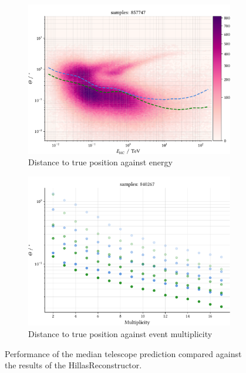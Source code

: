 \begin{figure}
    \centering
    \begin{subfigure}{0.5\textwidth}
        \includegraphics[width=\linewidth]{../analysis/plots/gamma/median_vs_energy.pdf} 
        \caption{Distance to true position against energy}
    \end{subfigure}
    \begin{subfigure}{0.5\textwidth}
        \includegraphics[width=\linewidth]{../analysis/plots/gamma/median_vs_multi_comp.pdf}
        \caption{Distance to true position against event multiplicity}
    \end{subfigure}
    \caption{Performance of the median telescope prediction compared 
    against the results of the HillasReconstructor. 
}
\end{figure}
